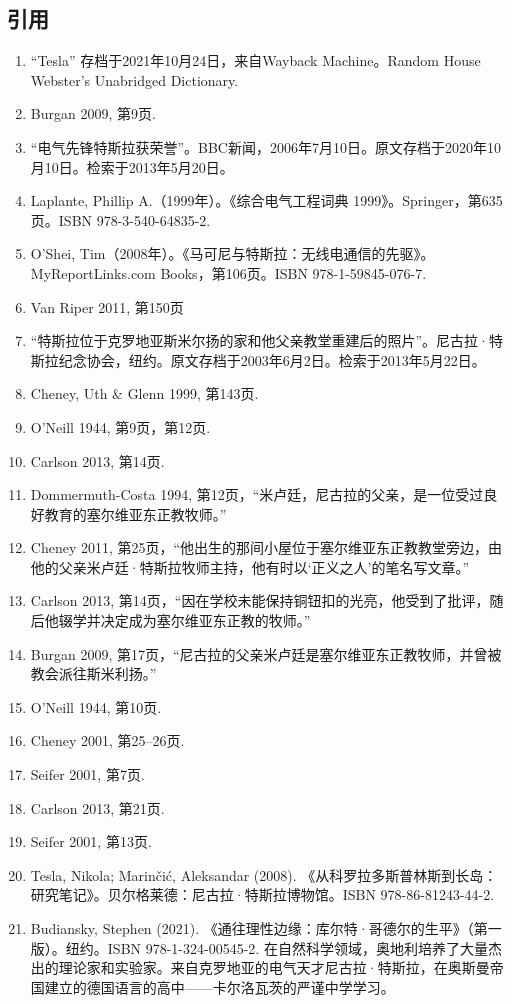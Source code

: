 \subsection{引用}
\begin{enumerate}
\item “Tesla” 存档于2021年10月24日，来自Wayback Machine。Random House Webster's Unabridged Dictionary.  
\item Burgan 2009, 第9页.  
\item “电气先锋特斯拉获荣誉”。BBC新闻，2006年7月10日。原文存档于2020年10月10日。检索于2013年5月20日。  
\item Laplante, Phillip A.（1999年）。《综合电气工程词典 1999》。Springer，第635页。ISBN 978-3-540-64835-2.  
\item O'Shei, Tim（2008年）。《马可尼与特斯拉：无线电通信的先驱》。MyReportLinks.com Books，第106页。ISBN 978-1-59845-076-7.  
\item Van Riper 2011, 第150页  
\item “特斯拉位于克罗地亚斯米尔扬的家和他父亲教堂重建后的照片”。尼古拉·特斯拉纪念协会，纽约。原文存档于2003年6月2日。检索于2013年5月22日。  
\item Cheney, Uth & Glenn 1999, 第143页.  
\item O'Neill 1944, 第9页，第12页.  
\item Carlson 2013, 第14页.
\item Dommermuth-Costa 1994, 第12页，“米卢廷，尼古拉的父亲，是一位受过良好教育的塞尔维亚东正教牧师。”  
\item Cheney 2011, 第25页，“他出生的那间小屋位于塞尔维亚东正教教堂旁边，由他的父亲米卢廷·特斯拉牧师主持，他有时以‘正义之人’的笔名写文章。”  
\item Carlson 2013, 第14页，“因在学校未能保持铜钮扣的光亮，他受到了批评，随后他辍学并决定成为塞尔维亚东正教的牧师。”  
\item Burgan 2009, 第17页，“尼古拉的父亲米卢廷是塞尔维亚东正教牧师，并曾被教会派往斯米利扬。”  
\item O'Neill 1944, 第10页.  
\item Cheney 2001, 第25–26页.  
\item Seifer 2001, 第7页.  
\item Carlson 2013, 第21页.  
\item Seifer 2001, 第13页.  
\item Tesla, Nikola; Marinčić, Aleksandar (2008). 《从科罗拉多斯普林斯到长岛：研究笔记》。贝尔格莱德：尼古拉·特斯拉博物馆。ISBN 978-86-81243-44-2.  
\item Budiansky, Stephen (2021). 《通往理性边缘：库尔特·哥德尔的生平》（第一版）。纽约。ISBN 978-1-324-00545-2. 在自然科学领域，奥地利培养了大量杰出的理论家和实验家。来自克罗地亚的电气天才尼古拉·特斯拉，在奥斯曼帝国建立的德国语言的高中——卡尔洛瓦茨的严谨中学学习。

\end{enumerate}
